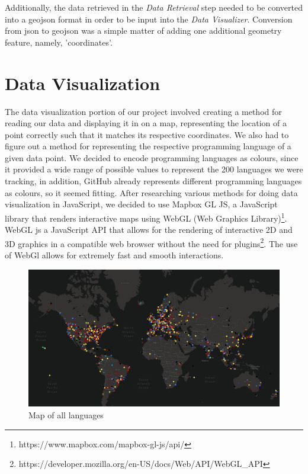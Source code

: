\documentclass[11pt]{article}
\begin{document}
Additionally, the data retrieved in the \textit{Data Retrieval} step needed to be converted into a geojson format in order to be input into the \textit{Data Visualizer}. Conversion from json to geojson was a simple matter of adding one additional geometry feature, namely, 'coordinates'.

\section{Data Visualization}
The data visualization portion of our project involved creating a method for reading our data and displaying it in on a map, representing the location of a point correctly such that it matches its respective coordinates. We also had to figure out a method for representing the respective programming language of a given data point. We decided to encode programming languages as colours, since it provided a wide range of possible values to represent the 200 languages we were tracking, in addition, GitHub already represents different programming languages as colours, so it seemed fitting.
After researching various methods for doing data visualization in JavaScript, we decided to use Mapbox GL JS, a JavaScript library that renders interactive maps using WebGL (Web Graphics Library)\footnote{https://www.mapbox.com/mapbox-gl-js/api/}. WebGL js a JavaScript API that allows for the rendering of interactive 2D and 3D graphics in a compatible web browser without the need for plugins\footnote{https://developer.mozilla.org/en-US/docs/Web/API/WebGL\_API}. The use of WebGl allows for extremely fast and smooth interactions.

\begin{figure}[H]
\centering
\includegraphics[scale=0.25]{Visualizer.png}
\caption{Map of all languages}
\label{fig:vis}
\end{figure}
\end{document}
